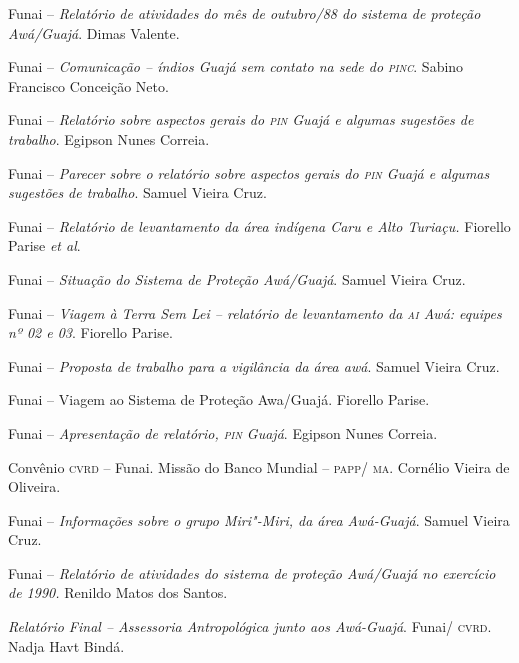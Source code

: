 \begin{itemize}
{\item[1988] Funai -- \emph{Relatório} \emph{de atividades do mês de
outubro/88 do sistema de proteção Awá/Guajá}. Dimas Valente.

\item[1988] Funai -- \emph{Comunicação -- índios Guajá sem contato na
sede do \textsc{pinc}}. Sabino Francisco Conceição Neto.

\item[1989] Funai -- \emph{Relatório sobre aspectos gerais do \textsc{pin}
Guajá e algumas sugestões de trabalho}. Egipson Nunes Correia.

\item[1989] Funai -- \emph{Parecer sobre o relatório sobre aspectos
gerais do \textsc{pin} Guajá e algumas sugestões de trabalho}. Samuel Vieira
Cruz.

\item[1989] Funai -- \emph{Relatório de levantamento da área indígena
Caru e Alto Turiaçu.} Fiorello Parise \emph{et al}.

\item[1989] Funai -- \emph{Situação do Sistema de Proteção
Awá/Guajá}. Samuel Vieira Cruz.

\item[1989] Funai -- \emph{Viagem à Terra Sem Lei -- relatório de
levantamento da \textsc{ai} Awá: equipes nº 02 e 03}. Fiorello Parise.

\item[1989] Funai -- \emph{Proposta de trabalho para a vigilância da
área awá}. Samuel Vieira Cruz.

\item[1990] Funai -- Viagem ao Sistema de Proteção Awa/Guajá.
Fiorello Parise.

\item[1990] Funai -- \emph{Apresentação de relatório, \textsc{pin} Guajá}.
Egipson Nunes Correia.

\item[1990] Convênio \textsc{cvrd} -- Funai. Missão do Banco Mundial -- \textsc{papp}/
\textsc{ma}. Cornélio Vieira de Oliveira.

\item[1990] Funai -- \emph{Informações sobre o grupo Miri"-Miri, da
área Awá-Guajá}. Samuel Vieira Cruz.

\item[1990] Funai -- \emph{Relatório de atividades do sistema de
proteção Awá/Guajá no exercício de 1990.} Renildo Matos dos Santos.

\item[1999] \emph{Relatório Final -- Assessoria Antropológica junto aos
Awá-Guajá}. Funai/ \textsc{cvrd}. Nadja Havt Bindá.

}
\end{itemize}
